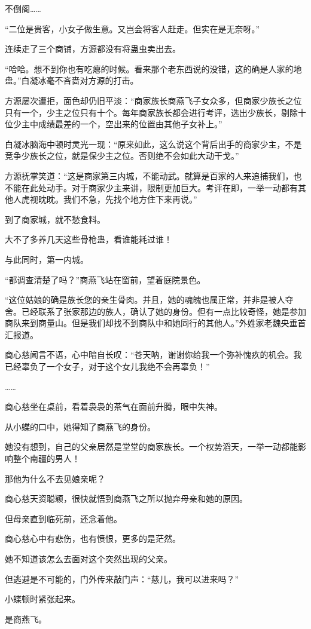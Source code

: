 \begin{this_body}
不倒阁……

“二位是贵客，小女子做生意。又岂会将客人赶走。但实在是无奈呀。”

连续走了三个商铺，方源都没有将蛊虫卖出去。

“哈哈。想不到你也有吃瘪的时候。看来那个老东西说的没错，这的确是人家的地盘。”白凝冰毫不吝啬对方源的打击。

方源屡次遭拒，面色却仍旧平淡：“商家族长商燕飞子女众多，但商家少族长之位只有一个，少主之位只有十个。每年商家族长都会进行考评，选出少族长，剔除十位少主中成绩最差的一个，空出来的位置由其他子女补上。”

白凝冰脑海中顿时灵光一现：“原来如此，这么说这个背后出手的商家少主，不是竞争少族长之位，就是保少主之位。否则绝不会如此大动干戈。”

方源抚掌笑道：“这是商家第三内城，不能动武。就算是百家的人来追捕我们，也不能在此处动手。对于商家少主来讲，限制更加巨大。考评在即，一举一动都有其他人虎视眈眈。我们不急，先找个地方住下来再说。”

到了商家城，就不愁食料。

大不了多养几天这些骨枪蛊，看谁能耗过谁！

与此同时，第一内城。

“都调查清楚了吗？”商燕飞站在窗前，望着庭院景色。

“这位姑娘的确是族长您的亲生骨肉。并且，她的魂魄也属正常，并非是被人夺舍。已经联系了张家那边的族人，确认了她的身份。但有一点比较奇怪，她是参加商队来到商量山。但是我们却找不到商队中和她同行的其他人。”外姓家老魏央垂首汇报道。

商心慈闻言不语，心中暗自长叹：“苍天呐，谢谢你给我一个弥补愧疚的机会。我已经辜负了一个女子，对于这个女儿我绝不会再辜负！”

……

商心慈坐在桌前，看着袅袅的茶气在面前升腾，眼中失神。

从小蝶的口中，她得知了商燕飞的身份。

她没有想到，自己的父亲居然是堂堂的商家族长。一个权势滔天，一举一动都能影响整个南疆的男人！

那他为什么不去见娘亲呢？

商心慈天资聪颖，很快就悟到商燕飞之所以抛弃母亲和她的原因。

但母亲直到临死前，还念着他。

商心慈心中有悲伤，也有愤恨，更多的是茫然。

她不知道该怎么去面对这个突然出现的父亲。

但逃避是不可能的，门外传来敲门声：“慈儿，我可以进来吗？”

小蝶顿时紧张起来。

是商燕飞。

\end{this_body}

